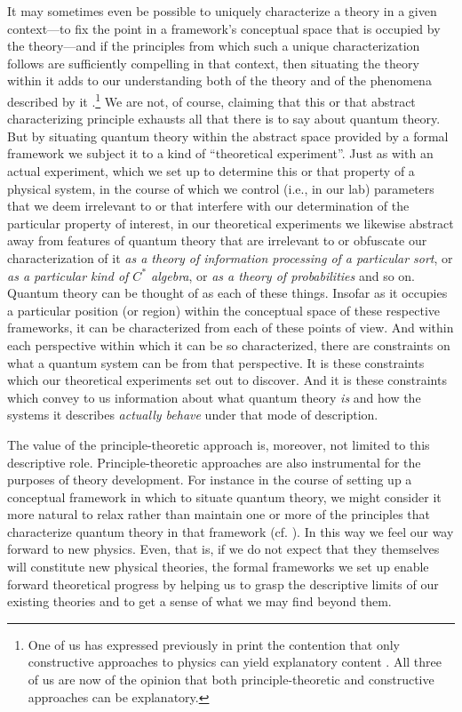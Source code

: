 It may sometimes even be possible to uniquely characterize a theory in a given context---to fix the point in a framework's conceptual space that is occupied by the theory---and if the principles from which such a unique characterization follows are sufficiently compelling in that context, then situating the theory within it adds to our understanding both of the theory and of the phenomena described by it \citep[cf., e.g.,][]{Masanes et al 2019}.\footnote{One of us has expressed previously in print the contention that only constructive approaches to physics can yield explanatory content \citep[]{Balashov and Janssen 2003, Janssen 2009}. All three of us are now of the opinion that both principle-theoretic and constructive approaches can be explanatory.} We are not, of course, claiming that this or that abstract characterizing principle exhausts all that there is to say about quantum theory. But by situating quantum theory within the abstract space provided by a formal framework we subject it to a kind of ``theoretical experiment''. Just as with an actual experiment, which we set up to determine this or that property of a physical system, in the course of which we control (i.e., in our lab) parameters that we deem irrelevant to or that interfere with our determination of the particular property of interest, in our theoretical experiments we likewise abstract away from features of quantum theory that are irrelevant to or obfuscate our characterization of it \emph{as a theory of information processing of a particular sort}, or \emph{as a particular kind of $C^*$ algebra}, or \emph{as a theory of probabilities} and so on. Quantum theory can be thought of as each of these things. Insofar as it occupies a particular position (or region) within the conceptual space of these respective frameworks, it can be characterized from each of these points of view. And within each perspective within which it can be so characterized, there are constraints on what a quantum system can be from that perspective. It is these constraints which our theoretical experiments set out to discover. And it is these constraints which convey to us information about what quantum theory \emph{is} and how the systems it describes \emph{actually behave} under that mode of description.

The value of the principle-theoretic approach is, moreover, not limited to this descriptive role. Principle-theoretic approaches are also instrumental for the purposes of theory development. For instance in the course of setting up a conceptual framework in which to situate quantum theory, we might consider it more natural to relax rather than maintain one or more of the principles that characterize quantum theory in that framework (cf. \citealt[]{Hardy 2007}). In this way we feel our way forward to new physics. Even, that is, if we do not expect that they themselves will constitute new physical theories, the formal frameworks we set up enable forward theoretical progress by helping us to grasp the descriptive limits of our existing theories and to get a sense of what we may find beyond them.

